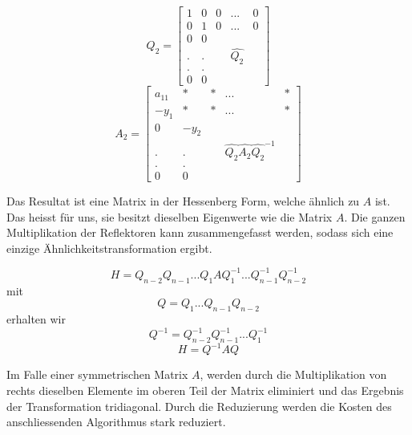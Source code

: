 \begin{equation}
	Q_{2}=
	\begin{bmatrix}
	1 & 0 & 0 & ... & 0\\
	0 & 1 & 0 & ... & 0\\
	0 & 0 &\\
	. & . & &\hat{Q_2} &\\
	. & . &\\
	0 & 0 &
	\end{bmatrix}
\end{equation}	
\begin{equation}
	A_{2}=
	\begin{bmatrix}
	a_{11} & * & * & ... & *\\
	-y_{1} & * & * & ... & *\\
	0 & -y_{2} &\\
	. & . & &\hat{Q_2}\hat{A_{2}}\hat{Q_2}^{-1} &\\
	. & . &\\
	0 & 0 &
	\end{bmatrix}
\end{equation}

Das Resultat ist eine Matrix in der Hessenberg Form, welche ähnlich zu $A$ ist.
Das heisst für uns, sie besitzt dieselben Eigenwerte wie die Matrix $A$.
Die ganzen Multiplikation der Reflektoren kann zusammengefasst werden, sodass sich eine einzige Ähnlichkeitstransformation ergibt.

\begin{equation}
	H=Q_{n-2}Q_{n-1}...Q_{1}AQ_{1}^{-1}...Q_{n-1}^{-1}Q_{n-2}^{-1}
\end{equation}
mit 
\begin{equation}
	Q=Q_{1}...Q_{n-1}Q_{n-2}
\end{equation}
erhalten wir
\begin{equation}
	Q^{-1} = Q_{n-2}^{-1}Q_{n-1}^{-1}...Q_{1}^{-1}
\end{equation}
\begin{equation}
H=Q^{-1}AQ
\end{equation}

Im Falle einer symmetrischen Matrix $A$, werden durch die Multiplikation von rechts dieselben Elemente im oberen Teil der Matrix eliminiert und das Ergebnis der Transformation tridiagonal.
Durch die Reduzierung werden die Kosten des anschliessenden Algorithmus stark reduziert.

